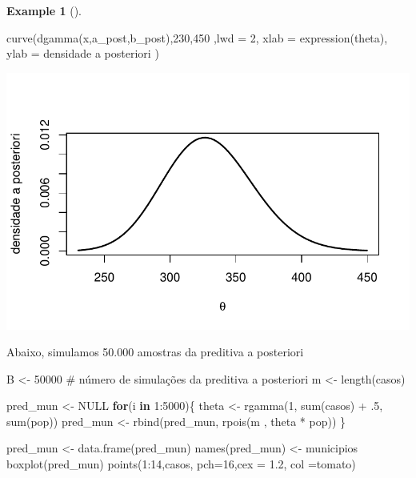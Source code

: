 \documentclass[
  letterpaper,
  DIV=11,
  numbers=noendperiod]{scrreprt}
\newenvironment{Shaded}{\begin{snugshade}}{\end{snugshade}}
\newcommand{\AttributeTok}[1]{\textcolor[rgb]{0.40,0.45,0.13}{#1}}
\newcommand{\CommentTok}[1]{\textcolor[rgb]{0.37,0.37,0.37}{#1}}
\newcommand{\ConstantTok}[1]{\textcolor[rgb]{0.56,0.35,0.01}{#1}}
\newcommand{\ControlFlowTok}[1]{\textcolor[rgb]{0.00,0.23,0.31}{\textbf{#1}}}
\newcommand{\DecValTok}[1]{\textcolor[rgb]{0.68,0.00,0.00}{#1}}
\newcommand{\FloatTok}[1]{\textcolor[rgb]{0.68,0.00,0.00}{#1}}
\newcommand{\FunctionTok}[1]{\textcolor[rgb]{0.28,0.35,0.67}{#1}}
\newcommand{\NormalTok}[1]{\textcolor[rgb]{0.00,0.23,0.31}{#1}}
\newcommand{\OtherTok}[1]{\textcolor[rgb]{0.00,0.23,0.31}{#1}}
\newcommand{\SpecialCharTok}[1]{\textcolor[rgb]{0.37,0.37,0.37}{#1}}
\newcommand{\StringTok}[1]{\textcolor[rgb]{0.13,0.47,0.30}{#1}}
\theoremstyle{definition}
\theoremstyle{plain}
\theoremstyle{definition}
\newtheorem{example}{Example}[chapter]
\theoremstyle{remark}
\begin{document}
\begin{example}[]
\begin{Shaded}
\begin{Highlighting}[]
\FunctionTok{curve}\NormalTok{(}\FunctionTok{dgamma}\NormalTok{(x,a\_post,b\_post),}\DecValTok{230}\NormalTok{,}\DecValTok{450}\NormalTok{ ,}\AttributeTok{lwd =} \DecValTok{2}\NormalTok{, }\AttributeTok{xlab =} \FunctionTok{expression}\NormalTok{(theta), }\AttributeTok{ylab =} \StringTok{\textquotesingle{}densidade a posteriori\textquotesingle{}}\NormalTok{ )}
\end{Highlighting}
\end{Shaded}

\includegraphics{poisson_files/figure-pdf/unnamed-chunk-2-1.pdf}

Abaixo, simulamos 50.000 amostras da preditiva a posteriori

\begin{Shaded}
\begin{Highlighting}[]
\NormalTok{B }\OtherTok{\textless{}{-}} \DecValTok{50000} \CommentTok{\# número de simulações da preditiva a posteriori}
\NormalTok{m }\OtherTok{\textless{}{-}} \FunctionTok{length}\NormalTok{(casos)}

\NormalTok{pred\_mun }\OtherTok{\textless{}{-}} \ConstantTok{NULL}
\ControlFlowTok{for}\NormalTok{(i }\ControlFlowTok{in} \DecValTok{1}\SpecialCharTok{:}\DecValTok{5000}\NormalTok{)\{}
\NormalTok{  theta }\OtherTok{\textless{}{-}} \FunctionTok{rgamma}\NormalTok{(}\DecValTok{1}\NormalTok{, }\FunctionTok{sum}\NormalTok{(casos) }\SpecialCharTok{+}\NormalTok{ .}\DecValTok{5}\NormalTok{, }\FunctionTok{sum}\NormalTok{(pop))}
\NormalTok{  pred\_mun }\OtherTok{\textless{}{-}} \FunctionTok{rbind}\NormalTok{(pred\_mun, }\FunctionTok{rpois}\NormalTok{(m , theta }\SpecialCharTok{*}\NormalTok{ pop))}
\NormalTok{\}}

\NormalTok{pred\_mun }\OtherTok{\textless{}{-}} \FunctionTok{data.frame}\NormalTok{(pred\_mun)}
\FunctionTok{names}\NormalTok{(pred\_mun) }\OtherTok{\textless{}{-}}\NormalTok{ municipios}
\FunctionTok{boxplot}\NormalTok{(pred\_mun)}
\FunctionTok{points}\NormalTok{(}\DecValTok{1}\SpecialCharTok{:}\DecValTok{14}\NormalTok{,casos, }\AttributeTok{pch=}\DecValTok{16}\NormalTok{,}\AttributeTok{cex =} \FloatTok{1.2}\NormalTok{, }\AttributeTok{col =}\StringTok{\textquotesingle{}tomato\textquotesingle{}}\NormalTok{)}
\end{Highlighting}
\end{Shaded}


\end{example}
\end{document}
